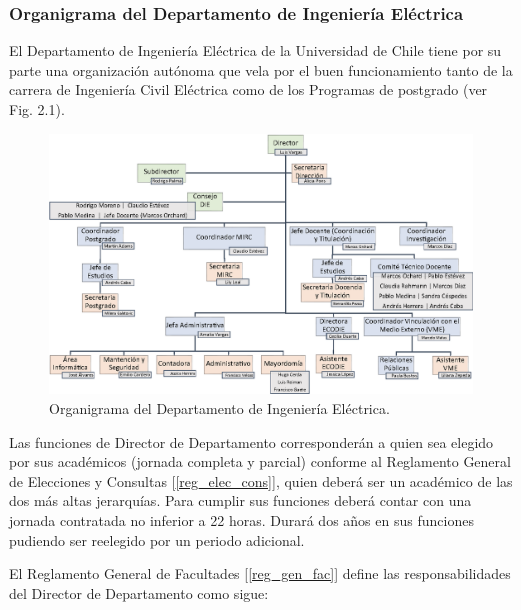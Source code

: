 \subsubsection{Organigrama del Departamento de Ingeniería Eléctrica}

El Departamento de Ingeniería Eléctrica de la Universidad de Chile tiene por su parte una
organización autónoma que vela por el buen funcionamiento tanto de la carrera de Ingeniería Civil
Eléctrica como de los Programas de postgrado (ver Fig. 2.1).

\begin{figure}[ht]
\centering
\includegraphics[width=\columnwidth]{./organigramas/die.eps}
\caption{Organigrama del Departamento de Ingeniería Eléctrica.}
\label{orga_die}
\end{figure}

Las funciones de Director de Departamento corresponderán a quien sea elegido por sus
académicos (jornada completa y parcial) conforme al Reglamento General de Elecciones y
Consultas [\ref{reg_elec_cons}], quien deberá ser un académico de las dos más altas jerarquías. Para cumplir
sus funciones deberá contar con una jornada contratada no inferior a 22 horas. Durará dos años en
sus funciones pudiendo ser reelegido por un periodo adicional.

El Reglamento General de Facultades [\ref{reg_gen_fac}] define las responsabilidades del Director de
Departamento como sigue:

